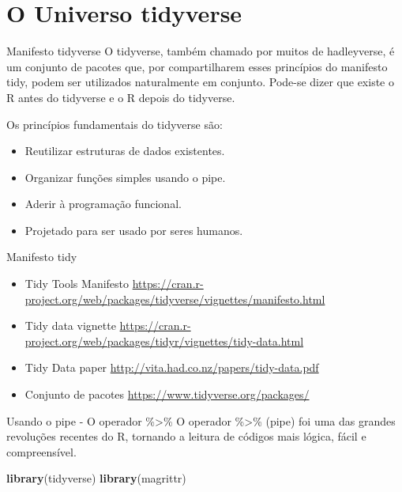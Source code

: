 \documentclass[
  10pt,
  ignorenonframetext,
]{beamer}
\newenvironment{Shaded}{\begin{snugshade}}{\end{snugshade}}
\newcommand{\KeywordTok}[1]{\textcolor[rgb]{0.13,0.29,0.53}{\textbf{#1}}}
\newcommand{\NormalTok}[1]{#1}
\begin{document}
\hypertarget{o-universo-tidyverse}{%
\section{O Universo tidyverse}\label{o-universo-tidyverse}}

\begin{frame}{Manifesto tidyverse}
\protect\hypertarget{manifesto-tidyverse}{}
O tidyverse, também chamado por muitos de hadleyverse, é um conjunto de
pacotes que, por compartilharem esses princípios do manifesto tidy,
podem ser utilizados naturalmente em conjunto. Pode-se dizer que existe
o R antes do tidyverse e o R depois do tidyverse.

Os princípios fundamentais do tidyverse são:

\begin{itemize}
\item
  Reutilizar estruturas de dados existentes.
\item
  Organizar funções simples usando o pipe.
\item
  Aderir à programação funcional.
\item
  Projetado para ser usado por seres humanos.
\end{itemize}
\end{frame}

\begin{frame}{Manifesto tidy}
\protect\hypertarget{manifesto-tidy}{}
\begin{itemize}
\item
  Tidy Tools Manifesto
  \url{https://cran.r-project.org/web/packages/tidyverse/vignettes/manifesto.html}
\item
  Tidy data vignette
  \url{https://cran.r-project.org/web/packages/tidyr/vignettes/tidy-data.html}
\item
  Tidy Data paper \url{http://vita.had.co.nz/papers/tidy-data.pdf}
\item
  Conjunto de pacotes \url{https://www.tidyverse.org/packages/}
\end{itemize}
\end{frame}

\begin{frame}[fragile]{Usando o pipe - O operador \%\textgreater\%}
\protect\hypertarget{usando-o-pipe---o-operador}{}
O operador \%\textgreater\% (pipe) foi uma das grandes revoluções
recentes do R, tornando a leitura de códigos mais lógica, fácil e
compreensível.

\begin{Shaded}
\begin{Highlighting}[]
\KeywordTok{library}\NormalTok{(tidyverse)}
\KeywordTok{library}\NormalTok{(magrittr)}
\end{Highlighting}
\end{Shaded}
\end{frame}
\end{document}
